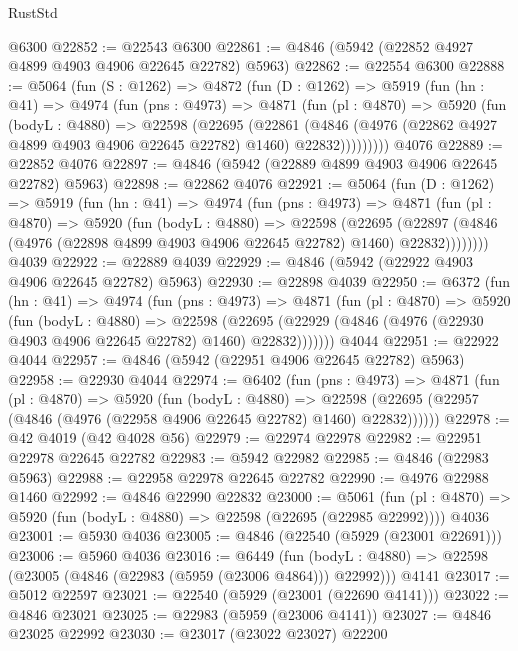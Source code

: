 \begin{lexlean}{RustStd}
\begin{coremodule}
    @6300
@22852 := @22543 @6300
@22861 := @4846 (@5942 (@22852 @4927 @4899 @4903 @4906 @22645 @22782) @5963)
@22862 := @22554 @6300
@22888 := @5064
    (fun (S : @1262) =>
    @4872
      (fun (D : @1262) =>
      @5919
        (fun (hn : @41) =>
        @4974
          (fun (pns : @4973) =>
          @4871
            (fun (pl : @4870) =>
            @5920
              (fun (bodyL : @4880) =>
              @22598
                (@22695
                  (@22861
                    (@4846
                      (@4976 (@22862 @4927 @4899 @4903 @4906 @22645 @22782) @1460)
                      @22832)))))))))
    @4076
@22889 := @22852 @4076
@22897 := @4846 (@5942 (@22889 @4899 @4903 @4906 @22645 @22782) @5963)
@22898 := @22862 @4076
@22921 := @5064
    (fun (D : @1262) =>
    @5919
      (fun (hn : @41) =>
      @4974
        (fun (pns : @4973) =>
        @4871
          (fun (pl : @4870) =>
          @5920
            (fun (bodyL : @4880) =>
            @22598
              (@22695
                (@22897 (@4846 (@4976 (@22898 @4899 @4903 @4906 @22645 @22782) @1460) @22832))))))))
    @4039
@22922 := @22889 @4039
@22929 := @4846 (@5942 (@22922 @4903 @4906 @22645 @22782) @5963)
@22930 := @22898 @4039
@22950 := @6372
    (fun (hn : @41) =>
    @4974
      (fun (pns : @4973) =>
      @4871
        (fun (pl : @4870) =>
        @5920
          (fun (bodyL : @4880) =>
          @22598
            (@22695 (@22929 (@4846 (@4976 (@22930 @4903 @4906 @22645 @22782) @1460) @22832)))))))
    @4044
@22951 := @22922 @4044
@22957 := @4846 (@5942 (@22951 @4906 @22645 @22782) @5963)
@22958 := @22930 @4044
@22974 := @6402
    (fun (pns : @4973) =>
    @4871
      (fun (pl : @4870) =>
      @5920
        (fun (bodyL : @4880) =>
        @22598 (@22695 (@22957 (@4846 (@4976 (@22958 @4906 @22645 @22782) @1460) @22832))))))
@22978 := @42 @4019 (@42 @4028 @56)
@22979 := @22974 @22978
@22982 := @22951 @22978 @22645 @22782
@22983 := @5942 @22982
@22985 := @4846 (@22983 @5963)
@22988 := @22958 @22978 @22645 @22782
@22990 := @4976 @22988 @1460
@22992 := @4846 @22990 @22832
@23000 := @5061
    (fun (pl : @4870) => @5920 (fun (bodyL : @4880) => @22598 (@22695 (@22985 @22992))))
    @4036
@23001 := @5930 @4036
@23005 := @4846 (@22540 (@5929 (@23001 @22691)))
@23006 := @5960 @4036
@23016 := @6449
    (fun (bodyL : @4880) => @22598 (@23005 (@4846 (@22983 (@5959 (@23006 @4864))) @22992)))
    @4141
@23017 := @5012 @22597
@23021 := @22540 (@5929 (@23001 (@22690 @4141)))
@23022 := @4846 @23021
@23025 := @22983 (@5959 (@23006 @4141))
@23027 := @4846 @23025 @22992
@23030 := @23017 (@23022 @23027) @22200

\end{coremodule}
\end{lexlean}
